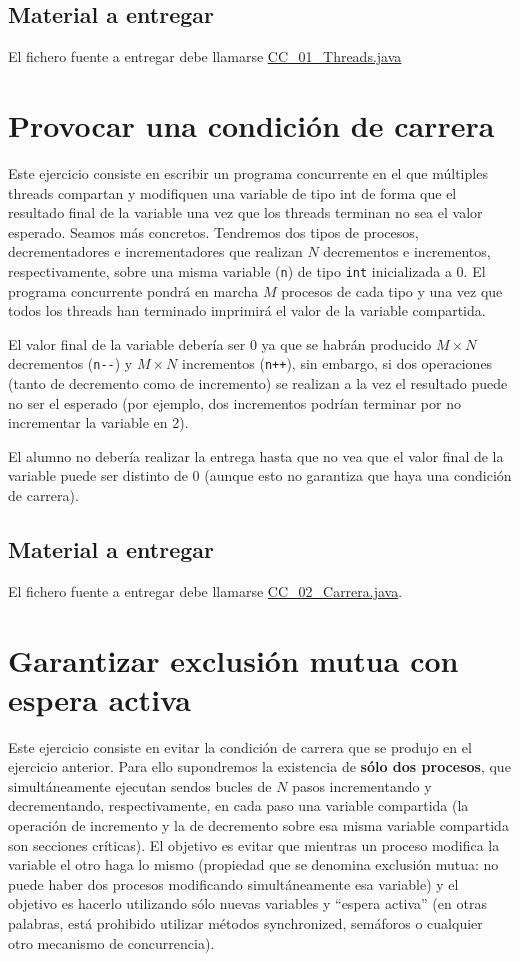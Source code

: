 \documentclass{article}
\begin{document}
\subsection*{Material a entregar}
El fichero fuente a entregar debe llamarse \url{CC_01_Threads.java}

\clearpage
\section{Provocar una condición de carrera}
Este ejercicio consiste en escribir un programa concurrente en el que
múltiples threads compartan y modifiquen una variable de tipo int de
forma que el resultado final de la variable una vez que los threads
terminan no sea el valor esperado. Seamos más concretos. Tendremos dos
tipos de procesos, decrementadores e incrementadores que realizan $N$
decrementos e incrementos, respectivamente, sobre una misma variable
(\lstinline{n}) de tipo \lstinline{int} inicializada a 0. El programa
concurrente pondrá en marcha $M$ procesos de cada tipo y una vez que
todos los threads han terminado imprimirá el valor de la variable
compartida.

El valor final de la variable debería ser 0 ya que se habrán producido
$M\times N$ decrementos (\lstinline{n--}) y $M\times N$ incrementos
(\lstinline{n++}), sin embargo, si dos operaciones (tanto de
decremento como de incremento) se realizan a la vez el resultado puede
no ser el esperado (por ejemplo, dos incrementos podrían terminar por no
incrementar la variable en 2).

El alumno no debería realizar la entrega hasta que no vea que el valor
final de la variable puede ser distinto de 0 (aunque esto no garantiza
que haya una condición de carrera).

\subsection*{Material a entregar}
El fichero fuente a entregar debe llamarse \url{CC_02_Carrera.java}.

\clearpage

\section{Garantizar exclusión mutua con espera activa}
Este ejercicio consiste en evitar la condición de carrera que se
produjo en el ejercicio anterior. Para ello supondremos la existencia
de \textbf{sólo dos procesos}, que simultáneamente ejecutan sendos
bucles de $N$ pasos incrementando y decrementando, respectivamente, en
cada paso una variable compartida (la operación de incremento y la de
decremento sobre esa misma variable compartida son secciones
críticas). El objetivo es evitar que mientras un proceso modifica la
variable el otro haga lo mismo (propiedad que se denomina exclusión
mutua: no puede haber dos procesos modificando simultáneamente esa
variable) y el objetivo es hacerlo utilizando sólo nuevas variables y
``espera activa'' (en otras palabras, está prohibido utilizar métodos
synchronized, semáforos o cualquier otro mecanismo de concurrencia).
\end{document}
